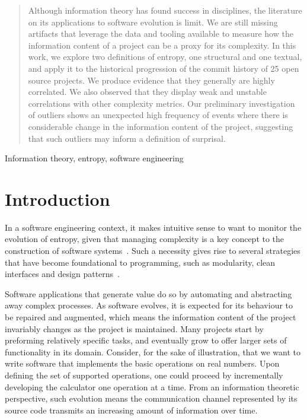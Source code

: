 \documentclass[10pt,conference]{IEEEtran}
\begin{document}
\begin{abstract}
Although information theory has found success in disciplines, the literature on its applications to software evolution is limit. We are still missing artifacts that leverage the data and tooling available to measure how the information content of a project can be a proxy for its complexity. In this work, we explore two definitions of entropy, one structural and one textual, and apply it to the historical progression of the commit history of 25 open source projects. We produce evidence that they generally are highly correlated. We also observed that they display weak and unstable correlations with other complexity metrics. Our preliminary investigation of outliers shows an unexpected high frequency of events where there is considerable change in the information content of the project, suggesting that such outliers may inform a definition of surprisal.
\end{abstract}

\begin{IEEEkeywords}
Information theory, entropy, software engineering
\end{IEEEkeywords}

\section{Introduction}
In a software engineering context, it makes intuitive sense to want to monitor the evolution of entropy, given that managing complexity is a key concept to the construction of software systems~\cite{McConnell:2004:CCS:1096143}. Such a necessity gives rise to several strategies that have become foundational to programming, such as modularity, clean interfaces and design patterns~\cite{gamma1995patterns}.

Software applications that generate value do so by automating and abstracting away complex processes. As software evolves, it is expected for its behaviour to be repaired and augmented, which means the information content of the project invariably changes as the project is maintained. Many projects start by preforming relatively specific tasks, and eventually grow to offer larger sets of functionality in its domain. Consider, for the sake of illustration, that we want to write software that implements the basic operations on real numbers. Upon defining the set of supported operations, one could proceed by incrementally developing the calculator one operation at a time. From an information theoretic perspective, such evolution means the communication channel represented by its source code transmits an increasing amount of information over time.
\end{document}
